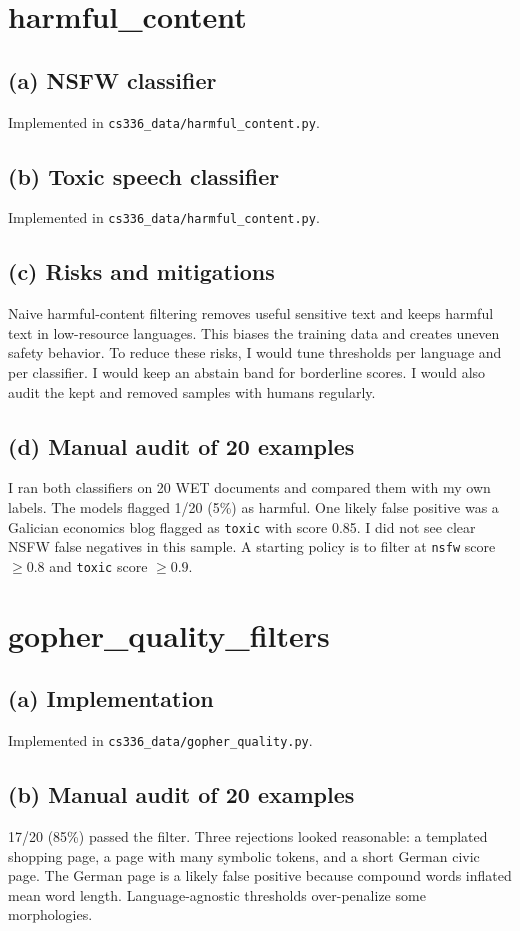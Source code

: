 \documentclass[11pt]{article}
\newcommand{\answer}[1]{#1}
\begin{document}
\section{harmful\_content}
\subsection*{(a) NSFW classifier}
\answer{Implemented in \texttt{cs336\_data/harmful\_content.py}.}

\subsection*{(b) Toxic speech classifier}
\answer{Implemented in \texttt{cs336\_data/harmful\_content.py}.}

\subsection*{(c) Risks and mitigations}
\answer{Naive harmful-content filtering removes useful sensitive text and keeps harmful text in low-resource languages. This biases the training data and creates uneven safety behavior. To reduce these risks, I would tune thresholds per language and per classifier. I would keep an abstain band for borderline scores. I would also audit the kept and removed samples with humans regularly.}

\subsection*{(d) Manual audit of 20 examples}
\answer{I ran both classifiers on 20 WET documents and compared them with my own labels. The models flagged 1/20 (5\%) as harmful. One likely false positive was a Galician economics blog flagged as \texttt{toxic} with score 0.85. I did not see clear NSFW false negatives in this sample. A starting policy is to filter at \texttt{nsfw} score \(\ge 0.8\) and \texttt{toxic} score \(\ge 0.9\).}

\section{gopher\_quality\_filters}
\subsection*{(a) Implementation}
\answer{Implemented in \texttt{cs336\_data/gopher\_quality.py}.}

\subsection*{(b) Manual audit of 20 examples}
\answer{17/20 (85\%) passed the filter. Three rejections looked reasonable: a templated shopping page, a page with many symbolic tokens, and a short German civic page. The German page is a likely false positive because compound words inflated mean word length. Language-agnostic thresholds over-penalize some morphologies.}
\end{document}
